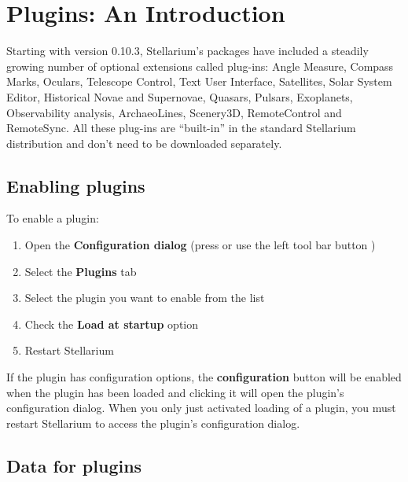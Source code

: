 
\chapter{Plugins: An Introduction}
\label{ch:Plugins}

Starting with version 0.10.3, Stellarium's packages have included a steadily growing number of
optional extensions called plug-ins: Angle Measure, Compass Marks, Oculars, Telescope Control, Text
User Interface, Satellites, Solar System Editor, Historical Novae and
Supernovae, Quasars, Pulsars, Exoplanets, Observability analysis, ArchaeoLines, Scenery3D,
RemoteControl and RemoteSync. All
these plug-ins are ``built-in'' in the standard Stellarium distribution
and don't need to be downloaded separately.


\section{Enabling plugins}
\label{sec:Plugins:EnablingPlugins}


To enable a plugin:

\begin{enumerate}
\item Open the \textbf{Configuration dialog} (press  or use
  the left tool bar button )
\item Select the \textbf{Plugins} tab
\item Select the plugin you want to enable from the list
\item Check the \textbf{Load at startup} option
\item Restart Stellarium
\end{enumerate}

\noindent If the plugin has configuration options, the
\textbf{configuration} button will be enabled when the plugin has been
loaded and clicking it will open the plugin's configuration
dialog. When you only just activated loading of a plugin, you must
restart Stellarium to access the plugin's configuration dialog.

\section{Data for plugins}
\label{sec:Plugins:DataForPlugins}

